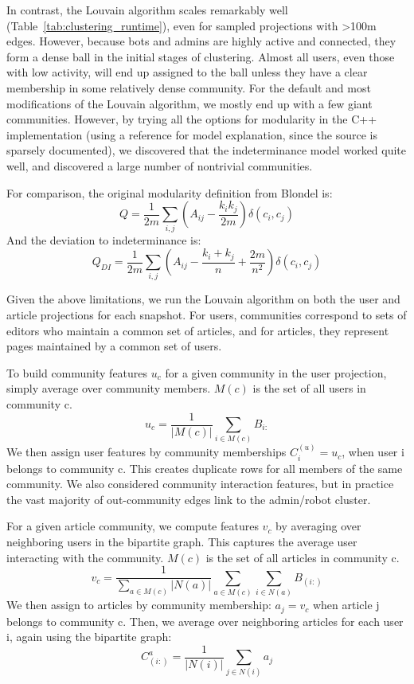 \documentclass[letterpaper, 12pt, conference]{ieeeconf}
\begin{document}
In contrast, the Louvain algorithm scales remarkably well (Table~\ref{tab:clustering_runtime}), even for sampled projections with >100m edges. However, because bots and admins are highly active and connected, they form a dense ball in the initial stages of clustering. Almost all users, even those with low activity, will end up assigned to the ball unless they have a clear membership in some relatively dense community. For the default and most modifications of the Louvain algorithm, we mostly end up with a few giant communities. However, by trying all the options for modularity in the C++ implementation (using a reference\cite{campigotto2014generalized} for model explanation, since the source is sparsely documented), we discovered that the indeterminance model worked quite well, and discovered a large number of nontrivial communities.

For comparison, the original modularity definition from Blondel is:
\begin{equation}
    Q = \frac{1}{2m} \sum_{i,j} (A_{ij} - \frac{k_i k_j}{2m}) \delta (c_i,c_j)
\end{equation}
And the deviation to indeterminance\cite{campigotto2014generalized} is:
\begin{equation}
    Q_{DI} = \frac{1}{2m} \sum_{i,j} (A_{ij} - \frac{k_i+k_j}{n} + \frac{2m}{n^2}) \delta (c_i,c_j)
\end{equation}

Given the above limitations, we run the Louvain algorithm on both the user and article projections for each snapshot. For users, communities correspond to sets of editors who maintain a common set of articles, and for articles, they represent pages maintained by a common set of users.

To build community features $u_c$ for a given community in the user projection, simply average over community members. $M(c)$ is the set of all users in community c.
\begin{equation}
    u_c = \frac{1}{|M(c)|} \sum_{i \in M(c)} B_{i:}
\end{equation}
We then assign user features by community memberships $C_i^{(u)} = u_c$, when user i belongs to community c. This creates duplicate rows for all members of the same community. We also considered community interaction features, but in practice the vast majority of out-community edges link to the admin/robot cluster.

For a given article community, we compute features $v_c$ by averaging over neighboring users in the bipartite graph. This captures the average user interacting with the community. $M(c)$ is the set of all articles in community c. 
\begin{equation}
    v_c = \frac{1}{\sum_{a \in M(c)}|N(a)|} 
    \sum_{a \in M(c)}\sum_{i \in N(a)} B_{(i:)}
\end{equation}
We then assign to articles by community membership: $a_j = v_c$ when article j belongs to community c. Then, we average over neighboring articles for each user i, again using the bipartite graph:
\begin{equation}
    C_{(i:)}^{a} = \frac{1}{|N(i)|} \sum_{j \in N(i)} a_j
\end{equation}
\end{document}
